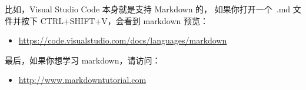比如，Visual Studio Code 本身就是支持 Markdown 的，
如果你打开一个\, .md 文件并按下 CTRL+SHIFT+V，会看到 markdown 预览：

\begin{itemize}
  \item \url{https://code.visualstudio.com/docs/languages/markdown}
\end{itemize}


最后，如果你想学习 markdown，请访问：

\begin{itemize}
  \item \url{http://www.markdowntutorial.com}
\end{itemize}
